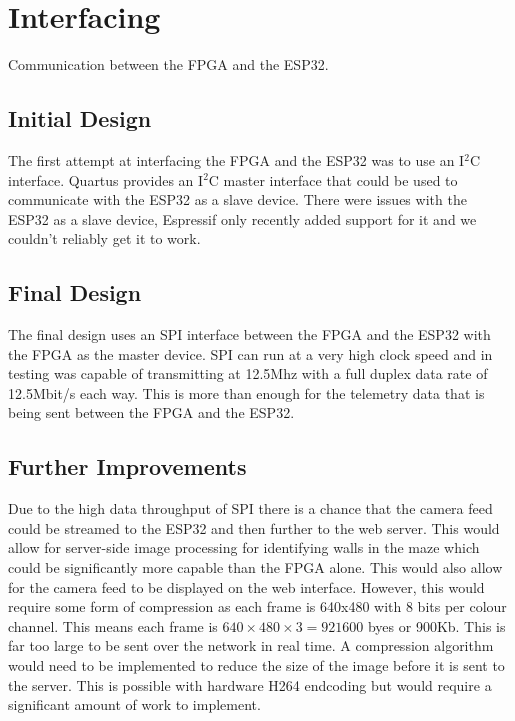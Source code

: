 \section{Interfacing}

Communication between the FPGA and the ESP32.

\subsection{Initial Design}
The first attempt at interfacing the FPGA and the ESP32 was to use an I$^2$C interface.
Quartus provides an I$^2$C master interface that could be used to communicate with the ESP32 as a slave device.
There were issues with the ESP32 as a slave device, Espressif only recently added support for it
and we couldn't reliably get it to work.

\subsection{Final Design}
The final design uses an SPI interface between the FPGA and the ESP32 with the FPGA as the master device.
SPI can run at a very high clock speed and in testing was capable of transmitting at 12.5Mhz with a full duplex data rate of 
12.5Mbit/s each way. This is more than enough for the telemetry data that is being sent between the FPGA and the ESP32.

\subsection{Further Improvements}
Due to the high data throughput of SPI there is a chance that the camera feed could be streamed to the ESP32 and then further to the web server. This would allow for server-side image processing for identifying walls in the maze which could be significantly more capable than
the FPGA alone. This would also allow for the camera feed to be displayed on the web interface. However, this would require some form of compression as each frame is 640x480 with 8 bits per colour channel.
This means each frame is $640 \times 480 \times 3 = 921600$ byes or 900Kb. This is far too large to be sent over the network in real time. A compression algorithm would need to be implemented to reduce the size of the image before it is sent to the server.
This is possible with hardware H264 endcoding but would require a significant amount of work to implement.
